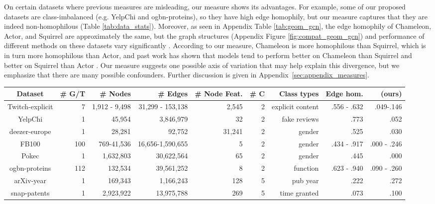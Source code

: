 \documentclass[sigconf, balance=false]{acmart}
\begin{document}
On certain datasets where previous measures are misleading, our measure shows its advantages. For example, some of our proposed datasets are class-imbalanced (e.g. YelpChi and ogbn-proteins), so they have high edge homophily, but our measure  captures that they are indeed non-homophilous (Table \ref{tab:data_stats}). Moreover, as seen in Appendix Table \ref{tab:geom_gcn}, the edge homophily of Chameleon, Actor, and Squirrel are approximately the same, but the graph structures (Appendix Figure \ref{fig:compat_geom_gcn}) and performance of different methods on these datasets vary significantly \cite{zhu2020beyond}. According to our measure, Chameleon is more homophilous than Squirrel, which is in turn more homophilous than Actor, and past work has shown that models tend to perform better on Chameleon than Squirrel and better on Squirrel than Actor \cite{zhu2020beyond, chien2021adaptive, pei2019geom}. Our measure suggests one possible axis of variation that may help explain this divergence, but we emphasize that there are many possible confounders.
Further discussion is given in Appendix~\ref{sec:appendix_measures}.

\begin{table*}[ht]
    \centering
    \caption{Statistics of our proposed non-homophilous graph datasets. \# C is the number of distinct node classes. \# G/T is the number of different graphs or tasks.  When there are multiple graphs or tasks, the minimum and maximum statistics are listed, with a hyphen ``-'' in between.}
    \label{tab:data_stats}
    {\small
    \begin{tabular}{crrrrrrrr}
    \toprule
    Dataset & \# G/T & \# Nodes & \# Edges &  \# Node Feat. & \# C & Class types & Edge hom. &  (ours) \\
    \midrule
         Twitch-explicit & 7  & 1,912 - 9,498 & 31,299 - 153,138 & 2,545 & 2 & explicit content  & .556 - .632 & .049-.146 \\
         YelpChi & 1 & 45,954 & 3,846,979 & 32 & 2 & fake reviews & .773 & .052 \\
         deezer-europe & 1 & 28,281 & 92,752 & 31,241 & 2 & gender & .525 & .030 \\
         FB100 & 100 & 769-41,536 & 16,656-1,590,655 & 5 & 2 & gender &  .434 - .917 & .000 - .246  \\
         Pokec & 1 & 1,632,803 & 30,622,564 & 65  &  2 & gender & .445 & .000 \\
         ogbn-proteins & 112 & 132,534 & 39,561,252 & 8 & 2 & function & .623 - .940 & .090 - .260  \\
         arXiv-year & 1 & 169,343 & 1,166,243 & 128 & 5 & pub year & .222 & .272  \\
         snap-patents & 1 & 2,923,922 & 13,975,788 & 269 & 5 & time granted & .073 & .100  \\
    \bottomrule
    \end{tabular}
    }
\end{table*}
\end{document}
